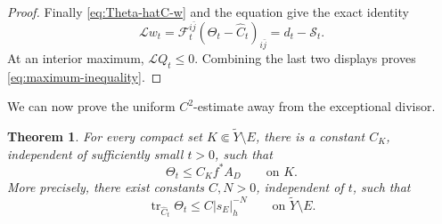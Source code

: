 \documentclass[reqno]{amsart}
\newcommand{\tr}{\operatorname{tr}}
\theoremstyle{plain}
\newtheorem{theorem}[thm]{Theorem}
\theoremstyle{remark}
\begin{document}
\begin{proof}
Finally \eqref{eq:Theta-hatC-w} and the equation give the exact identity
\begin{equation}\label{eq:Lw}
 \mathcal L w_t
 =\mathcal F_t^{i\bar j}(\Theta_t-\widehat C_t)_{i\bar j}
 =d_t-\mathcal S_t.
\end{equation}
At an interior maximum, $\mathcal L Q_t\leq0$. Combining the last two
displays proves \eqref{eq:maximum-inequality}.
\end{proof}

We can now prove the uniform $C^2$-estimate away from the exceptional
divisor.
\begin{theorem}
\label{thm:normal-C2}
For every compact set $K\Subset \widetilde Y\setminus E$, there is a constant $C_K$,
independent of sufficiently small $t>0$, such that
\begin{equation}\label{eq:C2-bound}
 \Theta_t\leq C_K f^*A_D\qquad\text{on }K.
\end{equation}
More precisely, there exist constants $C,N>0$, independent of $t$,
such that
\begin{equation}\label{eq:global-weighted-C2}
 \tr_{\widehat C_t}\Theta_t
 \leq C|s_E|_{h}^{-N}
 \qquad\text{on }\widetilde Y\setminus E.
\end{equation}
\end{theorem}
\end{document}
